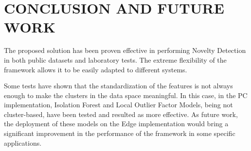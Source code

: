 \section{CONCLUSION AND FUTURE WORK}

The proposed solution has been proven effective in performing Novelty Detection in both public datasets and laboratory tests. The extreme flexibility of the framework allows it to be easily adapted to different systems. 

Some tests have shown that the standardization of the features is not always enough to make the clusters in the data space meaningful. In this case, in the PC implementation, Isolation Forest and Local Outlier Factor Models, being not cluster-based, have been tested and resulted as more effective. As future work, the deployment of these models on the Edge implementation would bring a significant improvement in the performance of the framework in some specific applications.